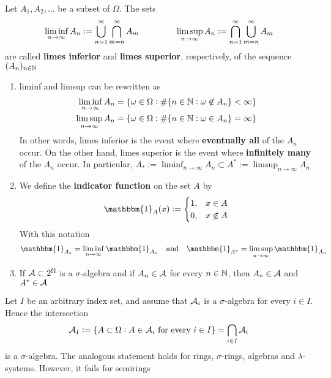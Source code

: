 \documentclass[11pt]{article}
\begin{document}
\begin{definition}
Let \(A_1,A_2,\dots\) be a subset of \(\Omega\). The sets
\begin{equation*}
\liminf_{n\to\infty}A_n:=\displaystyle\bigcup_{n=1}^\infty
\bigcap_{m=n}^\infty A_m\hspace{1.5cm}
\limsup_{n\to\infty}A_n:=\bigcap_{n=1}^\infty\bigcup_{m=n}^\infty
A_m
\end{equation*}
are called \textbf{limes inferior} and \textbf{limes superior}, respectively, of the sequence
\((A_n)_{n\in\mathbb{N}}\)
\end{definition}

\begin{remark}
\begin{enumerate}
\item lim\hspace{0.03cm}inf and lim\hspace{0.03cm}sup can be rewritten as
\begin{align*}
\liminf_{n\to\infty}A_n&=\{\omega\in\Omega:\#\{n\in\mathbb{N}:\omega\not\in A_n\}<\infty\}\\
\limsup_{n\to\infty}A_n&=\{\omega\in\Omega:\#\{n\in\mathbb{N}:\omega\in A_n\}=\infty\}
\end{align*}
In other words, limes inferior is the event where \textbf{eventually all} of the
\(A_n\) occur. On the other hand, limes superior is the event where
\textbf{infinitely many} of the \(A_n\) occur. In particular,
\(A_*:=\liminf_{n\to\infty}A_n\subset A^*:=\limsup_{n\to\infty}A_n\)
\item We define the \textbf{indicator function} on the set \(A\) by
\begin{equation*}
\mathbbm{1}_A(x):=
\begin{cases}
1,&x\in A\\
0,&x\not\in A
\end{cases}
\end{equation*}
With this notation 
\begin{equation*}
\mathbbm{1}_{A_*}=\liminf_{n\to\infty}\mathbbm{1}_{A_n}\quad\text{and}\quad
\mathbbm{1}_{A^*}=\limsup_{n\to\infty}\mathbbm{1}_{A_n}
\end{equation*}
\item If \(\mathcal{A}\subset2^\Omega\) is a \(\sigma\)-algebra and if \(A_n\in\mathcal{A}\) for
every \(n\in\mathbb{N}\), then \(A_*\in\mathcal{A}\) and \(A^*\in\mathcal{A}\)
\end{enumerate}
\end{remark}

\begin{theorem}
Let \(I\) be an arbitrary index set, and assume that \(\mathcal{A}_i\) is a
\(\sigma\)-algebra for every \(i\in I\). Hence the intersection
\begin{equation*}
\mathcal{A}_I:=\{A\subset\Omega:A\in\mathcal{A}_i\text{ for every }i\in I\}=
\displaystyle\bigcap_{i\in I}\mathcal{A}_i
\end{equation*}
is a \(\sigma\)-algebra. The analogous statement holds for rings, \(\sigma\)-rings,
algebras and \(\lambda\)-systems. However, it fails for semirings
\end{theorem}
\end{document}
